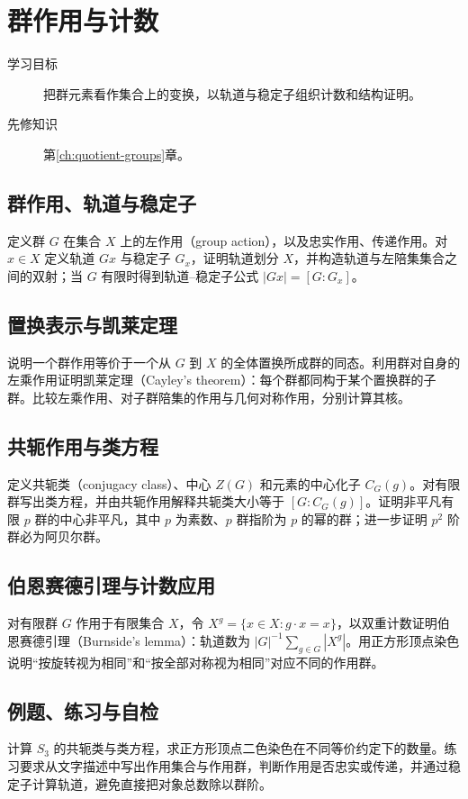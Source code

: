 \setcounter{chapter}{5} %
\chapter{群作用与计数}\label{ch:actions}

\begin{description}
  \item[学习目标] 把群元素看作集合上的变换，以轨道与稳定子组织计数和结构证明。
  \item[先修知识] 第\ref{ch:quotient-groups}章。
\end{description}

\section{群作用、轨道与稳定子}
定义群 $G$ 在集合 $X$ 上的左作用（group action），以及忠实作用、传递作用。对 $x\in X$ 定义轨道 $Gx$ 与稳定子 $G_x$，证明轨道划分 $X$，并构造轨道与左陪集集合之间的双射；当 $G$ 有限时得到轨道--稳定子公式 $|Gx|=[G:G_x]$。

\section{置换表示与凯莱定理}
说明一个群作用等价于一个从 $G$ 到 $X$ 的全体置换所成群的同态。利用群对自身的左乘作用证明凯莱定理（Cayley's theorem）：每个群都同构于某个置换群的子群。比较左乘作用、对子群陪集的作用与几何对称作用，分别计算其核。

\section{共轭作用与类方程}
定义共轭类（conjugacy class）、中心 $Z(G)$ 和元素的中心化子 $C_G(g)$。对有限群写出类方程，并由共轭作用解释共轭类大小等于 $[G:C_G(g)]$。证明非平凡有限 $p$ 群的中心非平凡，其中 $p$ 为素数、$p$ 群指阶为 $p$ 的幂的群；进一步证明 $p^2$ 阶群必为阿贝尔群。

\section{伯恩赛德引理与计数应用}
对有限群 $G$ 作用于有限集合 $X$，令 $X^g=\{x\in X:g\cdot x=x\}$，以双重计数证明伯恩赛德引理（Burnside's lemma）：轨道数为 $|G|^{-1}\sum_{g\in G}|X^g|$。用正方形顶点染色说明“按旋转视为相同”和“按全部对称视为相同”对应不同的作用群。

\section{例题、练习与自检}
计算 $S_3$ 的共轭类与类方程，求正方形顶点二色染色在不同等价约定下的数量。练习要求从文字描述中写出作用集合与作用群，判断作用是否忠实或传递，并通过稳定子计算轨道，避免直接把对象总数除以群阶。


